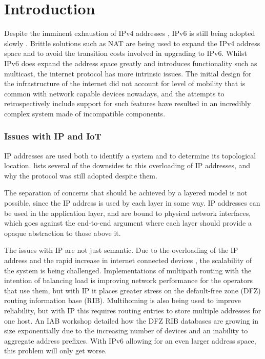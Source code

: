 \documentclass[12pt]{article}
\begin{document}
\newpage

\tableofcontents

\newpage
{}
\setcounter{page}{1} 

\part{Introduction}

Despite the imminent exhaustion of IPv4 addresses \cite{ripe_labs}, IPv6 is still being adopted slowly \cite{google_ipv6}. Brittle solutions such as NAT are being used to expand the IPv4 address space and to avoid the transition costs involved in upgrading to IPv6. Whilst IPv6 does expand the address space greatly and introduces functionality such as multicast, the internet protocol has more intrinsic issues. The initial design for the infrastructure of the internet did not account for level of mobility that is common with network capable devices nowadays, and the attempts to retrospectively include support for such features have resulted in an incredibly complex system made of incompatible components. 

\section{Issues with IP and IoT}

IP addresses are used both to identify a system and to determine its topological location. \cite{briancarpenter2014} lists several of the downsides to this overloading of IP addresses, and why the protocol was still adopted despite them.

The separation of concerns that should be achieved by a layered model is not possible, since the IP address is used by each layer in some way. IP addresses can be used in the application layer, and are bound to physical network interfaces, which goes against the end-to-end argument where each layer should provide a opaque abstraction to those above it.

The issues with IP are not just semantic. Due to the overloading of the IP address and the rapid increase in internet connected devices \cite{iot_stat}, the scalability of the system is being challenged. Implementations of multipath routing with the intention of balancing load is improving network performance for the operators that use them, but with IP it places greater stress on the default-free zone (DFZ) routing information base (RIB). Multihoming is also being used to improve reliability, but with IP this requires routing entries to store multiple addresses for one host. An IAB workshop \cite{rfc4984} detailed how the DFZ RIB databases are growing in size exponentially due to the increasing number of devices and an inability to aggregate address prefixes. With IPv6 allowing for an even larger address space, this problem will only get worse. 
\end{document}
